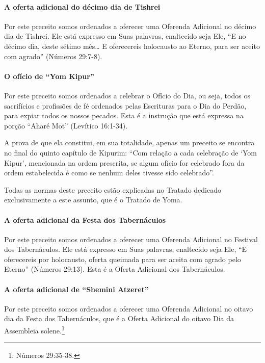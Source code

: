 \paragraph{A oferta adicional do décimo dia de Tishrei}

Por este preceito somos ordenados a oferecer uma Oferenda Adicional no
décimo dia de Tishrei. Ele está expresso em Suas palavras,
enaltecido seja Ele, ``E no décimo dia, deste sétimo mês\ldots{} E
oferecereis holocausto ao Eterno, para ser aceito com agrado'' (Números
29:7-8).

\paragraph{O ofício de ``Yom Kipur''}

Por este preceito somos ordenados a celebrar o Ofício do Dia, ou seja,
todos os sacrifícios e profissões de fé ordenados pelas Escrituras para
o Dia do Perdão, para expiar todos os nossos pecados. Esta é a instrução
que está expressa na porção ``Aharé Mot'' (Levítico 16:1-34).

A prova de que ela constitui, em sua totalidade, apenas um preceito se
encontra no final do quinto capítulo de Kipurim: ``Com relação a cada
celebração de `Yom Kipur', mencionada na ordem prescrita, se algum
ofício for celebrado fora da ordem estabelecida é como se nenhum deles
tivesse sido celebrado''.

Todas as normas deste preceito estão explicadas no Tratado dedicado
exclusivamente a este assunto, que é o Tratado de Yoma.

\paragraph{A oferta adicional da Festa dos Tabernáculos}

Por este preceito somos ordenados a oferecer uma Oferenda Adicional no
Festival dos Tabernáculos. Ele está expresso em Suas palavras,
enaltecido seja Ele, ``E oferecereis por holocausto, oferta queimada
para ser aceita com agrado pelo Eterno'' (Números 29:13). Esta é a
Oferta Adicional dos Tabernáculos.

\paragraph{A oferta adicional de ``Shemini Atzeret''}

Por este preceito somos ordenados a oferecer uma Oferenda Adicional no
oitavo dia da Festa dos Tabernáculos, que é a Oferta Adicional do oitavo
Dia da Assembleia solene.\footnote{Números 29:35-38.}

